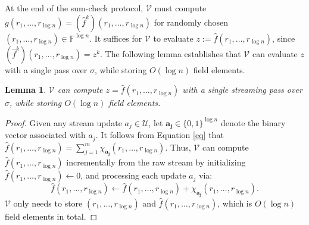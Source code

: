 \documentclass[11pt, letterpaper]{article}
\newtheorem{lemma}[theorem]{Lemma}
\newcommand{\length}{m}
\newcommand{\uni}{\mathcal{U}}
\newcommand{\cV}{\mathcal{V}}
\begin{document}
At the end of the sum-check protocol, $\cV$ must compute $g(r_1, \dots, r_{\log n}) = (\hat{f}^k)(r_1, \dots, r_{\log n})$ for randomly chosen $(r_1, \dots, r_{\log n}) \in \mathbb{F}^{\log n}$. It suffices for $\cV$ to evaluate $z:=\hat{f}(r_1, \dots, r_{\log n})$, since $(\hat{f}^k)(r_1, \dots, r_{\log n})=z^k$. The following lemma establishes
that $\cV$ can evaluate $z$ with a single pass over $\sigma$, while storing $O(\log n)$ field elements.

\begin{lemma}
$\cV$ can compute $z=\hat{f}(r_1, \dots, r_{\log n})$ with a single streaming pass over $\sigma$, while storing $O(\log n)$ field elements.
\end{lemma}
\begin{proof}
Given any stream update $a_j \in \uni$, let $\mathbf{a_j} \in \{0, 1\}^{\log n}$ denote the binary vector associated with $a_j$. 
It follows from Equation \eqref{eq} that $\hat{f}(r_1, \dots, r_{\log n}) = \sum_{j =1}^{\length} \chi_{\mathbf{a_j}}(r_1, \dots, r_{\log n})$.
Thus, $\cV$ can compute $\hat{f}(r_1, \dots, r_{\log n})$ incrementally from the raw stream by initializing $\hat{f}(r_1, \dots, r_{\log n}) \gets 0$, and processing each update $a_j$ via:
\[\hat{f}(r_1, \dots, r_{\log n}) \gets  \hat{f}(r_1, \dots, r_{\log n}) + \chi_{\mathbf{a_j}}(r_1, \dots, r_{\log n}).\]
$\cV$ only needs to store $(r_1, \dots, r_{\log n})$ and $\hat{f}(r_1, \dots, r_{\log n})$, which is $O(\log n)$ field elements in total.
\end{proof}

\nocite{aw, prakash, ccs,allspice, bestorder}
\end{document}
